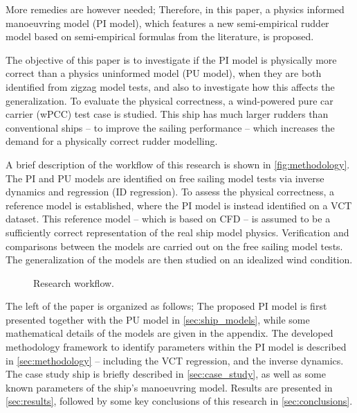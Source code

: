 More remedies are however needed; Therefore, in this paper, a physics informed manoeuvring model (PI model), which features a new semi-empirical rudder model based on semi-empirical formulas from the literature, is proposed.

The objective of this paper is to investigate if the PI model is physically more correct than a physics uninformed model (PU model), when they are both identified from zigzag model tests, and also to investigate how this affects the generalization.
To evaluate the physical correctness, a wind-powered pure car carrier (wPCC) test case is studied. 
This ship has much larger rudders than conventional ships -- to improve the sailing performance -- 
which increases the demand for a physically correct rudder modelling.

A brief description of the workflow of this research is shown in \autoref{fig:methodology}.
The PI and PU models are identified on free sailing model tests via inverse dynamics \citep{faber_inverse_2018} and regression (ID regression). To assess the physical correctness, a reference model is established, where the PI model is instead identified on a VCT dataset. This reference model -- which is based on CFD -- is assumed to be a sufficiently correct representation of the real ship model physics.
Verification and comparisons between the models are carried out on the free sailing model tests. The generalization of the models are then studied on an idealized wind condition.
%
\begin{figure}[h]
  \centering
  
  \caption{Research workflow.}
  \label{fig:methodology}
\end{figure}

The left of the paper is organized as follows; The proposed PI model is first presented together with the PU 
 model in \autoref{sec:ship_models}, while some mathematical details of the models are given in the appendix. 
The developed methodology framework to identify parameters within the PI model is described in \autoref{sec:methodology} -- including the VCT regression, and the inverse dynamics. The case study ship is briefly described in \autoref{sec:case_study}, as well as some known parameters of the ship's manoeuvring model. Results are presented in \autoref{sec:results}, followed by some key conclusions of this research in \autoref{sec:conclusions}.